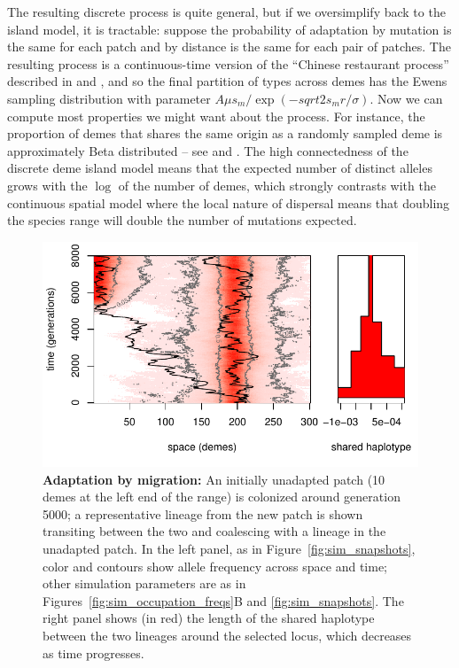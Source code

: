 \documentclass{article}
\begin{document}
The resulting discrete process is quite general,
but if we oversimplify back to the island model, it is tractable:
suppose the probability of adaptation by mutation is the same for each patch
and by distance is the same for each pair of patches.
The resulting process is a continuous-time version of the ``Chinese restaurant process''
described in \citet{aldous1985exchangeability} and \citet{pitman1995partitions},
and so the final partition of types across demes has the Ewens
sampling distribution with parameter $A \mu s_m/ \exp (-sqrt{2 s_m}r/\sigma)$.
Now we can compute most properties we might want about the process.
For instance, the proportion of demes that shares the same origin as a randomly sampled deme
is approximately Beta distributed -- see \cite{donnelly1989continuity} and \cite{perman1992sizebiased}.
The high connectedness of the discrete deme island model means that the expected number of distinct alleles
grows with the $\log$ of the number of demes, 
which strongly contrasts with the continuous spatial model 
where the local nature of dispersal means that doubling the species range will double the number of mutations expected. 


\begin{figure}[ht]
  \begin{center}
    \includegraphics{sim-transit.pdf}
  \end{center}
  \caption{
  \textbf{Adaptation by migration:}
  An initially unadapted patch (10 demes at the left end of the range) is colonized around generation 5000;
  a representative lineage from the new patch is shown transiting between the two and coalescing with a lineage
  in the unadapted patch.
  In the left panel, as in Figure~\ref{fig:sim_snapshots}, color and contours show allele frequency across space and time;
  other simulation parameters are as in Figures~\ref{fig:sim_occupation_freqs}B and \ref{fig:sim_snapshots}.
  The right panel shows (in red) the length of the shared haplotype between the two lineages
  around the selected locus,
  which decreases as time progresses.
  \label{fig:lineagesmotion}
  }
\end{figure}
\end{document}
